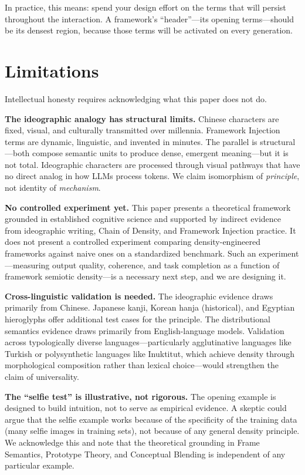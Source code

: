 \documentclass[12pt,a4paper]{article}
\begin{document}
In practice, this means: spend your design effort on the terms that will persist throughout the interaction.
A framework's ``header''---its opening terms---should be its densest region, because those terms will be activated on every generation.


\section{Limitations}
\label{sec:limitations}

Intellectual honesty requires acknowledging what this paper does not do.

\textbf{The ideographic analogy has structural limits.}
Chinese characters are fixed, visual, and culturally transmitted over millennia.
Framework Injection terms are dynamic, linguistic, and invented in minutes.
The parallel is structural---both compose semantic units to produce dense, emergent meaning---but it is not total.
Ideographic characters are processed through visual pathways that have no direct analog in how LLMs process tokens.
We claim isomorphism of \textit{principle}, not identity of \textit{mechanism}.

\textbf{No controlled experiment yet.}
This paper presents a theoretical framework grounded in established cognitive science and supported by indirect evidence from ideographic writing, Chain of Density, and Framework Injection practice.
It does not present a controlled experiment comparing density-engineered frameworks against naive ones on a standardized benchmark.
Such an experiment---measuring output quality, coherence, and task completion as a function of framework semiotic density---is a necessary next step, and we are designing it.

\textbf{Cross-linguistic validation is needed.}
The ideographic evidence draws primarily from Chinese.
Japanese kanji, Korean hanja (historical), and Egyptian hieroglyphs offer additional test cases for the principle.
The distributional semantics evidence draws primarily from English-language models.
Validation across typologically diverse languages---particularly agglutinative languages like Turkish or polysynthetic languages like Inuktitut, which achieve density through morphological composition rather than lexical choice---would strengthen the claim of universality.

\textbf{The ``selfie test'' is illustrative, not rigorous.}
The opening example is designed to build intuition, not to serve as empirical evidence.
A skeptic could argue that the selfie example works because of the specificity of the training data (many selfie images in training sets), not because of any general density principle.
We acknowledge this and note that the theoretical grounding in Frame Semantics, Prototype Theory, and Conceptual Blending is independent of any particular example.
\end{document}
